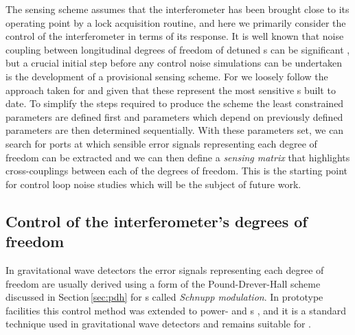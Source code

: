 The sensing scheme assumes that the interferometer has been brought close to its operating point by a lock acquisition routine, and here we primarily consider the control of the interferometer in terms of its response. It is well known that noise coupling between longitudinal degrees of freedom of detuned \DRFPMI{}s can be significant \cite{Hild2007}, but a crucial initial step before any control noise simulations can be undertaken is the development of a provisional sensing scheme. For \ETLF{} we loosely follow the approach taken for \ALIGO{} \cite{Abbott2010} and \AVIRGO{} \cite{Vajente2008} given that these represent the most sensitive \DRFPMI{}s built to date. To simplify the steps required to produce the scheme the least constrained parameters are defined first and parameters which depend on previously defined parameters are then determined sequentially. With these parameters set, we can search for ports at which sensible error signals representing each degree of freedom can be extracted and we can then define a \emph{sensing matrix} that highlights cross-couplings between each of the degrees of freedom. This is the starting point for control loop noise studies which will be the subject of future work.

\subsection{\label{sec:decoupled-sidebands}Control of the interferometer's degrees of freedom}
In gravitational wave detectors the error signals representing each degree of freedom are usually derived using a form of the Pound-Drever-Hall scheme discussed in Section\,\ref{sec:pdh} for \MI{}s called \emph{Schnupp modulation}. In prototype facilities this control method was extended to power- \cite{Regehr1995} and \DRFPMI{}s \cite{Heinzel1998}, and it is a standard technique used in gravitational wave detectors and remains suitable for \ETLF{}.

